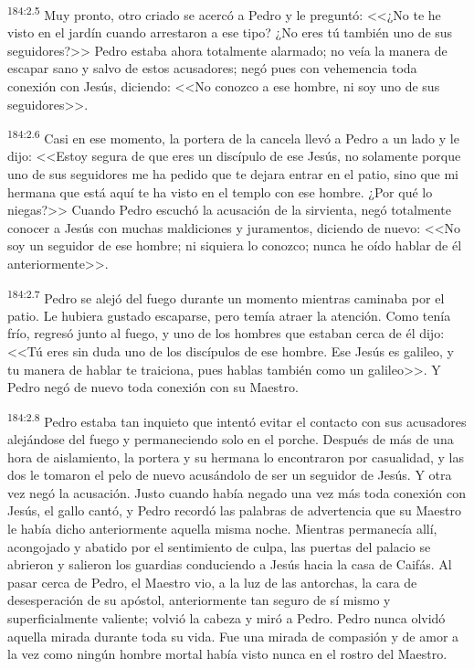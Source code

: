 \par 
\textsuperscript{184:2.5} Muy pronto, otro criado se acercó a Pedro y le preguntó: <<¿No te he visto en el jardín cuando arrestaron a ese tipo? ¿No eres tú también uno de sus seguidores?>> Pedro estaba ahora totalmente alarmado; no veía la manera de escapar sano y salvo de estos acusadores; negó pues con vehemencia toda conexión con Jesús, diciendo: <<No conozco a ese hombre, ni soy uno de sus seguidores>>.

\par 
\textsuperscript{184:2.6} Casi en ese momento, la portera de la cancela llevó a Pedro a un lado y le dijo: <<Estoy segura de que eres un discípulo de ese Jesús, no solamente porque uno de sus seguidores me ha pedido que te dejara entrar en el patio, sino que mi hermana que está aquí te ha visto en el templo con ese hombre. ¿Por qué lo niegas?>> Cuando Pedro escuchó la acusación de la sirvienta, negó totalmente conocer a Jesús con muchas maldiciones y juramentos, diciendo de nuevo: <<No soy un seguidor de ese hombre; ni siquiera lo conozco; nunca he oído hablar de él anteriormente>>.

\par 
\textsuperscript{184:2.7} Pedro se alejó del fuego durante un momento mientras caminaba por el patio. Le hubiera gustado escaparse, pero temía atraer la atención. Como tenía frío, regresó junto al fuego, y uno de los hombres que estaban cerca de él dijo: <<Tú eres sin duda uno de los discípulos de ese hombre. Ese Jesús es galileo, y tu manera de hablar te traiciona, pues hablas también como un galileo>>. Y Pedro negó de nuevo toda conexión con su Maestro.

\par 
\textsuperscript{184:2.8} Pedro estaba tan inquieto que intentó evitar el contacto con sus acusadores alejándose del fuego y permaneciendo solo en el porche. Después de más de una hora de aislamiento, la portera y su hermana lo encontraron por casualidad, y las dos le tomaron el pelo de nuevo acusándolo de ser un seguidor de Jesús. Y otra vez negó la acusación. Justo cuando había negado una vez más toda conexión con Jesús, el gallo cantó, y Pedro recordó las palabras de advertencia que su Maestro le había dicho anteriormente aquella misma noche. Mientras permanecía allí, acongojado y abatido por el sentimiento de culpa, las puertas del palacio se abrieron y salieron los guardias conduciendo a Jesús hacia la casa de Caifás. Al pasar cerca de Pedro, el Maestro vio, a la luz de las antorchas, la cara de desesperación de su apóstol, anteriormente tan seguro de sí mismo y superficialmente valiente; volvió la cabeza y miró a Pedro. Pedro nunca olvidó aquella mirada durante toda su vida. Fue una mirada de compasión y de amor a la vez como ningún hombre mortal había visto nunca en el rostro del Maestro.

